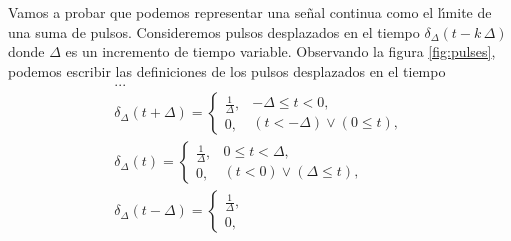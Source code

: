 Vamos a probar que podemos representar una se\~{n}al 
continua como el l\'{\i}mite de una suma de pulsos.
Consideremos pulsos desplazados en el tiempo $\delta _{\Delta }\left(t-k \, \Delta \right)$ 
donde $\Delta$ es un incremento de tiempo variable. 
Observando la figura \ref{fig:pulses}, podemos escribir las definiciones de los pulsos desplazados en el tiempo
\begin{equation}
        \begin{array}{c}
                ...                                             \\ 
                \delta _{\Delta }\left( t+\Delta \right) =
                        \left\{ \begin{array}{l}
                                        \frac{1}{\Delta },      \\ 
                                        0,
                                \end{array}
                                \begin{array}{l}
                                        -\Delta \leq t<0,       \\ 
                                        \left( t<-\Delta \right) \vee \left( 0\leq t\right) ,
                                \end{array}
                        \right.                                 \\ 
                \delta _{\Delta }\left( t\right) =
                        \left\{ \begin{array}{l}
                                        \frac{1}{\Delta },      \\ 
                                        0,
                                \end{array}
                                \begin{array}{l}
                                        0\leq t<\Delta ,        \\ 
                                        \left( t<0\right) \vee \left( \Delta \leq t\right) ,
                                \end{array}
                        \right.                                 \\ 
                \delta _{\Delta }\left( t-\Delta \right) =
                        \left\{ \begin{array}{l}
                                        \frac{1}{\Delta },      \\ 
                                        0,

\end{array}
\end{array}
\end{equation}
